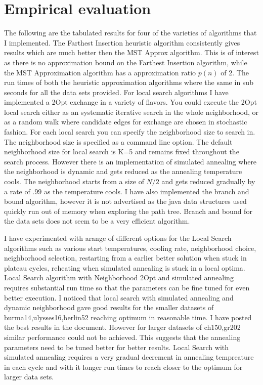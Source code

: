 \documentclass[twoside,11pt]{article}
\begin{document}
\section{Empirical evaluation}
The following are the tabulated results for four of the varieties of algorithms that I implemented. The Farthest Insertion heuristic algorithm consistently gives results which are much better then the MST Approx algorithm. This is of interest as there is no approximation bound on the Farthest Insertion algorithm, while the MST Approximation algorithm has a approximation ratio $p(n)$ of 2. The run times of both the heuristic approximation algorithms where the same in sub seconds for all the data sets provided. 
For local search algorithms I have implemented a 2Opt exchange in a variety of flavors. You could execute the 2Opt local search either as an systematic iterative search in the whole neighborhood, or as a random walk where candidate edges for exchange are chosen in stochastic fashion. For each local search you can specify the neighborhood size to search in. The neighborhood size is specified as a command line option. The default neighborhood size for local search is K=5 and remains fixed throughout the search process. However there is an implementation of simulated annealing where the neighborhood is dynamic and gets reduced as the annealing temperature cools. The neighborhood starts from a size of $N/2$ and gets reduced gradually by a rate of $.99$ as the temperature cools.  I have also implemented the branch and bound algorithm, however it is not advertised as the java data structures used quickly run out of memory when exploring the path tree. Branch and bound for the data sets does not seem to be a very efficient algorithm.

I have experimented with arange of different options for the Local Search algorithms such as various start temperatures, cooling rate, neighborhood choice, neighborhood selection, restarting from a earlier better solution when stuck in plateau cycles, reheating when simulated annealing is stuck in a local optima. Local Search algorithm with Neighborhood 2Opt and simulated annealing requires substantial run time so that the parameters can be fine tuned for even better execution.  I noticed that local search with simulated annealing and dynamic neighborhood gave good results for the smaller datasets of burma14,ulysses16,berlin52 reaching optimum in reasonable time. I have posted the best results in the document. However for larger datasets of ch150,gr202 similar performance could not be achieved. This suggests that the annealing parameters need to be tuned better for better results. Local Search with simulated annealing requires a very gradual decrement in annealing tempreature in each cycle and with it longer run times to reach closer to the optimum for larger data sets.
\end{document}

